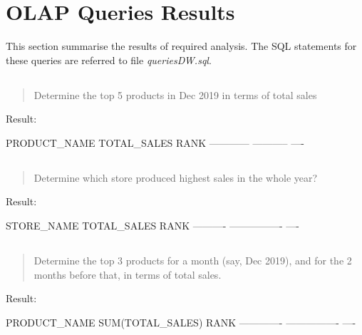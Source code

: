 \documentclass[
  12pt,
  a4paper,
]{article}
\begin{document}
\hypertarget{olap-queries-results}{%
\section{OLAP Queries Results}\label{olap-queries-results}}

This section summarise the results of required analysis. The SQL
statements for these queries are referred to file \emph{queriesDW.sql}.

\let\oldsubsection\thesubsection
\renewcommand*{\thesubsection}{Question~\arabic{subsection}}

\hypertarget{section}{%
\subsection{}\label{section}}

\begin{quote}
Determine the top 5 products in Dec 2019 in terms of total sales
\end{quote}

Result:

PRODUCT\_NAME TOTAL\_SALES RANK ------------ ----------- ----

\hypertarget{section-1}{%
\subsection{}\label{section-1}}

\begin{quote}
Determine which store produced highest sales in the whole year?
\end{quote}

Result:

STORE\_NAME TOTAL\_SALES RANK ---------- ---------------- ----

\hypertarget{section-2}{%
\subsection{}\label{section-2}}

\begin{quote}
Determine the top 3 products for a month (say, Dec 2019), and for the 2
months before that, in terms of total sales.
\end{quote}

Result:

PRODUCT\_NAME SUM(TOTAL\_SALES) RANK ------------- ---------------- ----

\hypertarget{section-3}{%
\subsection{}\label{section-3}}
\end{document}
